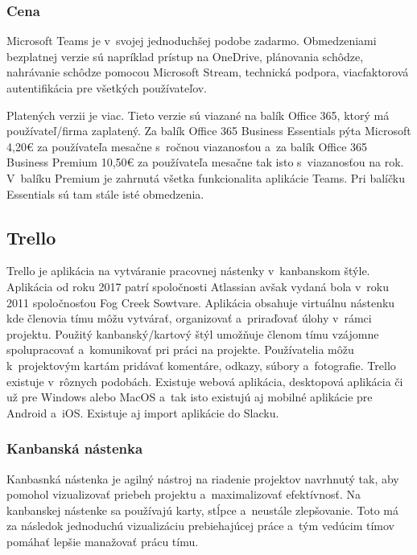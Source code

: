\subsubsection{Cena}
\indent Microsoft Teams je v svojej jednoduchšej podobe zadarmo. Obmedzeniami bezplatnej verzie sú napríklad prístup na OneDrive, plánovania schôdze, nahrávanie schôdze pomocou Microsoft Stream, technická podpora, viacfaktorová autentifikácia pre všetkých používateľov. 

\indent Platených verzii je viac. Tieto verzie sú viazané na balík Office 365, ktorý má používateľ/firma zaplatený. Za balík Office 365 Business Essentials pýta Microsoft 4,20€ za používateľa mesačne s ročnou viazanosťou a za balík Office 365 Business Premium 10,50€ za používateľa mesačne tak isto s viazanosťou na rok. V balíku Premium je zahrnutá všetka funkcionalita aplikácie Teams. Pri balíčku Essentials sú tam stále isté obmedzenia.

\subsection{Trello}
\indent Trello je aplikácia na vytváranie pracovnej nástenky v kanbanskom štýle. Aplikácia od roku 2017 patrí spoločnosti Atlassian avšak vydaná bola v roku 2011 spoločnosťou Fog Creek Sowtvare. Aplikácia obsahuje virtuálnu nástenku kde členovia tímu môžu vytvárať, organizovať a priraďovať úlohy v rámci projektu. Použitý kanbanský/kartový štýl umožňuje členom tímu vzájomne spolupracovať a komunikovať pri práci na projekte. Používatelia môžu k projektovým kartám pridávať komentáre, odkazy, súbory a fotografie. Trello existuje v rôznych podobách. Existuje webová aplikácia, desktopová aplikácia či už pre Windows alebo MacOS a tak isto existujú aj mobilné aplikácie pre Android a iOS. Existuje aj import aplikácie do Slacku.
\subsubsection{Kanbanská nástenka}
\indent Kanbasnká nástenka je agilný nástroj na riadenie projektov navrhnutý tak, aby pomohol vizualizovať priebeh projektu a maximalizovať efektívnosť. Na kanbanskej nástenke sa používajú karty, stĺpce a neustále zlepšovanie. Toto má za následok jednoduchú vizualizáciu prebiehajúcej práce a tým vedúcim tímov pomáhať lepšie manažovať prácu tímu. 

